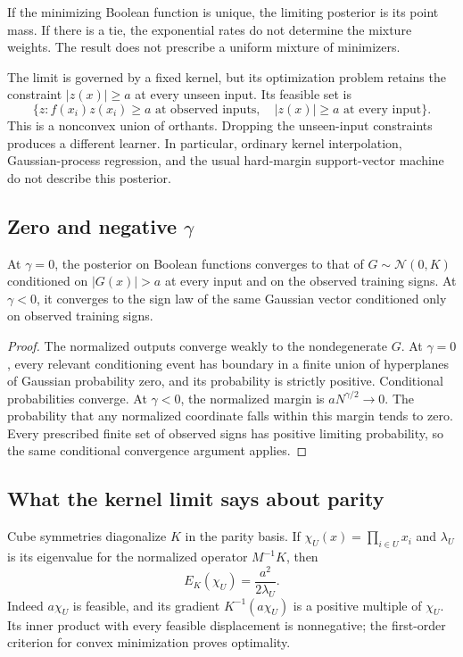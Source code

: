 If the minimizing Boolean function is unique, the limiting posterior
is its point mass. If there is a tie, the exponential rates do not
determine the mixture weights. The result does not prescribe a uniform
mixture of minimizers.

The limit is governed by a fixed kernel, but its optimization problem
retains the constraint $|z(x)|\ge a$ at every unseen input. Its feasible
set is
\[
 \{z:f(x_i)z(x_i)\ge a\text{ at observed inputs},\quad
             |z(x)|\ge a\text{ at every input}\}.
\]
This is a nonconvex union of orthants. Dropping the unseen-input
constraints produces a different learner. In particular, ordinary
kernel interpolation, Gaussian-process regression, and the usual
hard-margin support-vector machine do not describe this posterior.

\subsection{Zero and negative \texorpdfstring{$\gamma$}{gamma}}

\begin{proposition}
\label{prop:nonpositive-gamma}
At $\gamma=0$, the posterior on Boolean functions converges to that of
$G\sim\mathcal N(0,K)$ conditioned on $|G(x)|>a$ at every input and on
the observed training signs. At $\gamma<0$, it converges to the sign
law of the same Gaussian vector conditioned only on observed training
signs.
\end{proposition}

\begin{proof}
The normalized outputs converge weakly to the nondegenerate $G$.
At $\gamma=0$, every relevant conditioning event has boundary in a
finite union of hyperplanes of Gaussian probability zero, and its
probability is strictly positive. Conditional probabilities converge.
At $\gamma<0$, the normalized margin is
$aN^{\gamma/2}\to0$. The probability that any normalized coordinate
falls within this margin tends to zero. Every prescribed finite set
of observed signs has positive limiting probability, so the same
conditional convergence argument applies.
\end{proof}

\subsection{What the kernel limit says about parity}

Cube symmetries diagonalize $K$ in the parity basis. If
$\chi_U(x)=\prod_{i\in U}x_i$ and $\lambda_U$ is its eigenvalue for
the normalized operator $M^{-1}K$, then
\begin{equation}\label{eq:parity-kernel-energy}
 E_K(\chi_U)=\frac{a^2}{2\lambda_U}.
\end{equation}
Indeed $a\chi_U$ is feasible, and its gradient
$K^{-1}(a\chi_U)$ is a positive multiple of $\chi_U$. Its inner product
with every feasible displacement is nonnegative; the first-order
criterion for convex minimization proves optimality.

